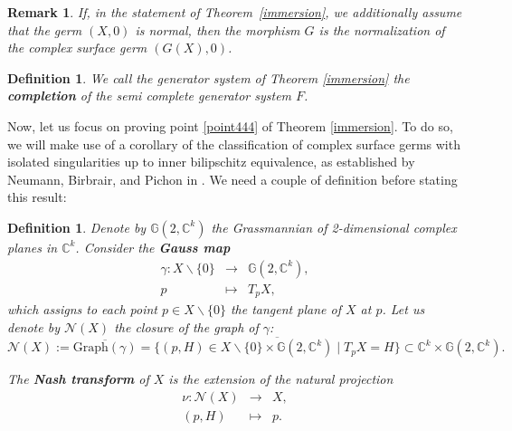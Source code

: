 \documentclass[reqno,dvipsnames,12pt]{amsart}
\renewcommand{\setminus}{\smallsetminus}
\newtheorem{rema}[thm]{Remark}
\newtheorem{defi}[thm]{Definition}
\begin{document}
\begin{rema}\label{remarkokanormalization}
If, in the statement of Theorem~\ref{immersion}, we additionally assume that the germ $(X,0)$ is normal, then the morphism $G$ is the normalization of the complex surface germ $(G(X),0)$.
\end{rema}

\begin{defi}\label{completeimmersion}
We call the generator system of Theorem \ref{immersion} the \textbf{completion} of the semi complete generator system $F$.
\end{defi}


Now, let us focus on proving point \ref{point444} of Theorem \ref{immersion}. To do so, we will make use of a corollary of  the classification of complex surface germs with isolated singularities up to inner bilipschitz equivalence, as established by Neumann, Birbrair, and Pichon in \cite{BNP}. We need a couple of definition before stating this result:
\begin{defi}\label{spivaknash}
Denote by $\mathbb{G}(2,\mathbb{C}^k)$ the Grassmannian of 2-dimensional complex planes in $\mathbb{C}^k$. Consider the \textbf{Gauss map}
\[
\begin{array}{rcl}
\gamma: X \setminus \{0\} &\longrightarrow& \mathbb{G}(2,\mathbb{C}^k), \\
p &\longmapsto& T_p X,
\end{array}
\]
which assigns to each point $p \in X \setminus \{0\}$ the tangent plane of $X$ at $p$. Let us denote by $\mathcal{N}(X)$ the closure of the graph of $\gamma$:
\[
\mathcal{N}(X) := \overline{\mathrm{Graph}(\gamma)} 
= \overline{\{ (p,H) \in X \setminus \{0\} \times \mathbb{G}(2,\mathbb{C}^k) \mid T_p X = H \}} 
\subset \mathbb{C}^k \times \mathbb{G}(2,\mathbb{C}^k).
\]

The \textbf{Nash transform} of $X$ is the extension of the natural projection
\[
\begin{array}{rcl}
\nu : \mathcal{N}(X) &\longrightarrow& X, \\
(p,H) &\longmapsto& p.
\end{array}
\]
\end{defi}



\end{document}
